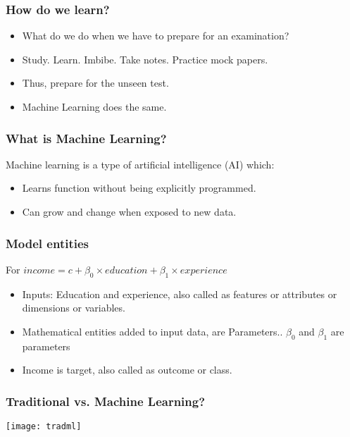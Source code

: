 \begin{frame}[fragile]\frametitle{How do we learn?}
\begin{itemize}
	\item What do we do when we have to prepare for an examination? 
	\item Study. Learn. Imbibe. Take notes. Practice mock papers.
	\item  Thus,  prepare for the unseen test.
	\item Machine Learning does the same.
\end{itemize}
\end{frame}



\begin{frame}[fragile]\frametitle{What is Machine Learning?}
Machine learning is a type of artificial intelligence (AI) which:
\begin{itemize}
\item Learns function without being explicitly programmed. 
\item Can grow and change when exposed to new data. 
\end{itemize}
\end{frame}


\begin{frame}[fragile]\frametitle{Model entities}
For $income = c + \beta_0 \times education + \beta_1 \times experience$
\begin{itemize}
\item Inputs: Education and experience, also called as features or attributes or dimensions or variables.
\item Mathematical entities added to input data, are Parameters.. $\beta_0$ and $\beta_1$ are parameters
\item Income is target, also called as outcome or class.
\end{itemize}
\end{frame}

\begin{frame}[fragile]\frametitle{Traditional vs. Machine Learning?}
\begin{center}
\texttt{[image: tradml]}
\end{center}
\end{frame}


